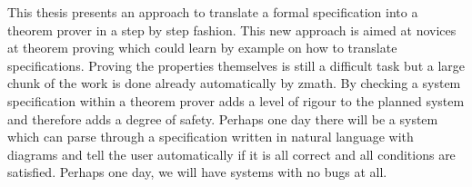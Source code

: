 This thesis presents an approach to translate a formal specification into a theorem prover in a step by step fashion. This new approach is aimed at novices at theorem proving which could learn by example on how to translate specifications. Proving the properties themselves is still a difficult task but a large chunk of the work is done already automatically by \gls{zmath}. By checking a system specification within a theorem prover adds a level of rigour to the planned system and therefore adds a degree of safety. Perhaps one day there will be a system which can parse through a specification written in natural language with diagrams and tell the user automatically if it is all correct and all conditions are satisfied. Perhaps one day, we will have systems with no bugs at all.
